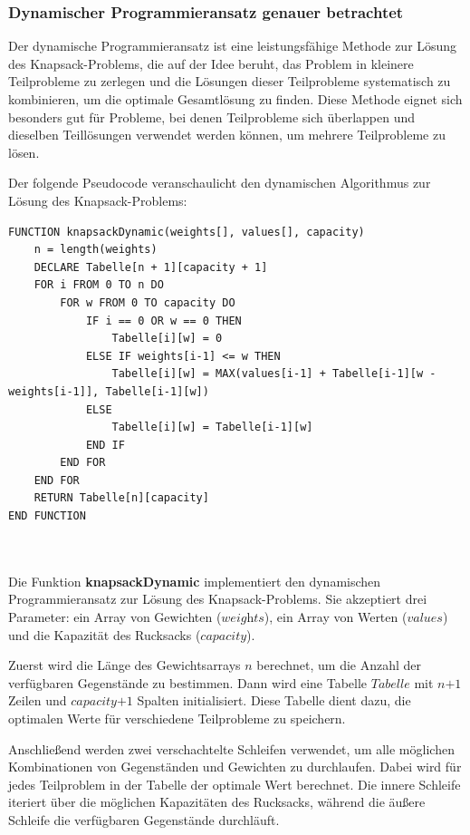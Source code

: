 \subsubsection*{Dynamischer Programmieransatz genauer betrachtet}
Der dynamische Programmieransatz ist eine leistungsfähige Methode zur Lösung des Knapsack-Problems, die auf der Idee beruht,
das Problem in kleinere Teilprobleme zu zerlegen und die Lösungen dieser Teilprobleme systematisch zu kombinieren, um die
optimale Gesamtlösung zu finden. Diese Methode eignet sich besonders gut für Probleme, bei denen Teilprobleme sich überlappen
und dieselben Teillösungen verwendet werden können, um mehrere Teilprobleme zu lösen.

Der folgende Pseudocode veranschaulicht den dynamischen Algorithmus zur Lösung des Knapsack-Problems:
\begin{lstlisting}[style=csharp, caption={Dynamischer Algorithmus}]
FUNCTION knapsackDynamic(weights[], values[], capacity)
    n = length(weights)
    DECLARE Tabelle[n + 1][capacity + 1]
    FOR i FROM 0 TO n DO
        FOR w FROM 0 TO capacity DO
            IF i == 0 OR w == 0 THEN
                Tabelle[i][w] = 0
            ELSE IF weights[i-1] <= w THEN
                Tabelle[i][w] = MAX(values[i-1] + Tabelle[i-1][w - weights[i-1]], Tabelle[i-1][w])
            ELSE
                Tabelle[i][w] = Tabelle[i-1][w]
            END IF
        END FOR
    END FOR
    RETURN Tabelle[n][capacity]
END FUNCTION
\end{lstlisting}\\
\\
Die Funktion \textbf{knapsackDynamic} implementiert den dynamischen Programmieransatz zur Lösung des Knapsack-Problems.
Sie akzeptiert drei Parameter: ein Array von Gewichten (\( \textit{weights} \)), ein Array von Werten (\( \textit{values} \))
und die Kapazität des Rucksacks (\( \textit{capacity} \)).

Zuerst wird die Länge des Gewichtsarrays \( \textit{n} \) berechnet, um die Anzahl der verfügbaren Gegenstände zu bestimmen.
Dann wird eine Tabelle \( \textit{Tabelle} \) mit \( \textit{n+1} \) Zeilen und \( \textit{capacity+1} \) Spalten initialisiert.
Diese Tabelle dient dazu, die optimalen Werte für verschiedene Teilprobleme zu speichern.

Anschließend werden zwei verschachtelte Schleifen verwendet, um alle möglichen Kombinationen von Gegenständen und Gewichten
zu durchlaufen. Dabei wird für jedes Teilproblem in der Tabelle der optimale Wert berechnet. Die innere Schleife iteriert
über die möglichen Kapazitäten des Rucksacks, während die äußere Schleife die verfügbaren Gegenstände durchläuft.

